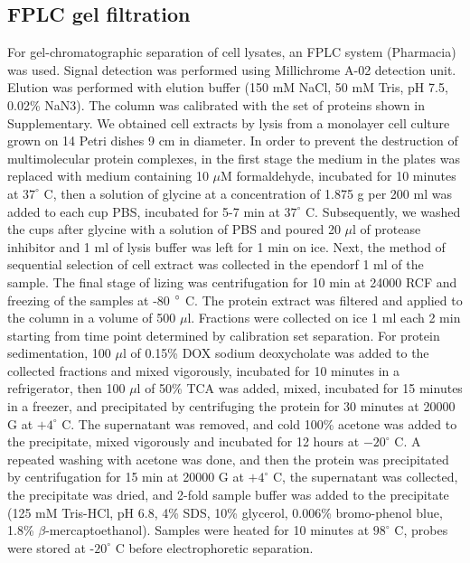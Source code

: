 \documentclass[alpha-refs]{wiley-article}
\begin{document}
\subsection{FPLC gel filtration}

For gel-chromatographic separation of cell lysates, an FPLC system (Pharmacia) was used.
Signal detection was performed using Millichrome A-02 detection unit.
Elution was performed with elution buffer (150 mM NaCl, 50 mM Tris, pH 7.5, 0.02\% NaN3).
The column was calibrated with the set of proteins shown in Supplementary.
We obtained cell extracts by lysis from a monolayer cell culture grown on 14 Petri dishes 9 cm in diameter.
In order to prevent the destruction of multimolecular protein complexes, in the first stage the medium in the plates was replaced with medium containing 10 $\mu$M formaldehyde, incubated for 10 minutes at $37^{\circ}$ C, then a solution of glycine at a concentration of 1.875 g per 200 ml was added to each cup PBS, incubated for 5-7 min at  $37^{\circ}$  C.
Subsequently, we washed the cups after glycine with a solution of PBS and poured 20 $\mu$l of protease inhibitor and 1 ml of lysis buffer was left for 1 min on ice.
Next, the method of sequential selection of cell extract was collected in the ependorf 1 ml of the sample.
The final stage of lizing was centrifugation for 10 min at 24000 RCF and freezing of the samples at -80 $\degree$ C.
The protein extract was filtered and applied to the column in a volume of 500 $\mu$l.
Fractions were collected on ice 1 ml each 2 min starting from time point determined by calibration set separation.
For protein sedimentation, 100 $\mu$l of 0.15\% DOX sodium deoxycholate was added to the collected fractions and mixed vigorously, incubated for 10 minutes in a refrigerator, then 100 $\mu$l of 50\% TCA was added, mixed, incubated for 15 minutes in a freezer, and precipitated by centrifuging the protein for 30 minutes at 20000 G at $+4^{\circ}$ C.
The supernatant was removed, and cold 100\% acetone was added to the precipitate, mixed vigorously and incubated for 12 hours at $-20^{\circ}$ C.
A repeated washing with acetone was done, and then the protein was precipitated by centrifugation for 15 min at 20000 G at $+4^{\circ}$ C, the supernatant was collected, the precipitate was dried, and 2-fold sample buffer was added to the precipitate (125 mM Tris-HCl, pH 6.8, 4\% SDS, 10\% glycerol, 0.006\% bromo-phenol blue, 1.8\% $\beta$-mercaptoethanol).
Samples were heated for 10 minutes at $98^{\circ}$ C, probes were stored at -$20^{\circ}$ C before electrophoretic separation.
\end{document}
